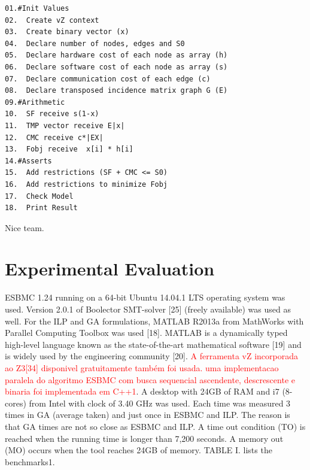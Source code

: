 \begin{lstlisting}
01.#Init Values
02.  Create vZ context 
03.  Create binary vector (x)
04.  Declare number of nodes, edges and S0
05.  Declare hardware cost of each node as array (h) 
06.  Declare software cost of each node as array (s)
07.  Declare communication cost of each edge (c)
08.  Declare transposed incidence matrix graph G (E)
09.#Arithmetic
10.  SF receive s(1-x)
11.  TMP vector receive E|x| 
12.  CMC receive c*|EX|
13.  Fobj receive  x[i] * h[i]
14.#Asserts
15.  Add restrictions (SF + CMC <= S0)
16.  Add restrictions to minimize Fobj
17.  Check Model
18.  Print Result
\end{lstlisting}

Nice team.

\section{Experimental Evaluation}
ESBMC 1.24 running on a 64-bit Ubuntu 14.04.1 LTS operating system was used. Version 2.0.1 of Boolector SMT-solver [25] (freely available) was used as well. For the ILP and GA formulations, MATLAB R2013a from MathWorks with Parallel Computing Toolbox was used [18]. MATLAB is a dynamically typed high-level language known as the state-of-the-art mathematical software [19] and is widely used by the engineering community [20]. \textcolor{Red}{A ferramenta vZ incorporada ao Z3[34] disponivel gratuitamente também foi usada. uma implementacao paralela do algoritmo ESBMC com busca sequencial ascendente, descrescente e binaria foi implementada em C++1}. A desktop with 24GB of RAM and i7 (8-cores) from Intel with clock of 3.40 GHz was used. Each time was measured 3 times in GA (average taken) and just once in ESBMC and ILP. The reason is that GA times are not so close as ESBMC and ILP. A time out condition (TO) is reached when the running time is longer than 7,200 seconds. A memory out (MO) occurs when the tool reaches 24GB of memory. TABLE I. lists the benchmarks1.

